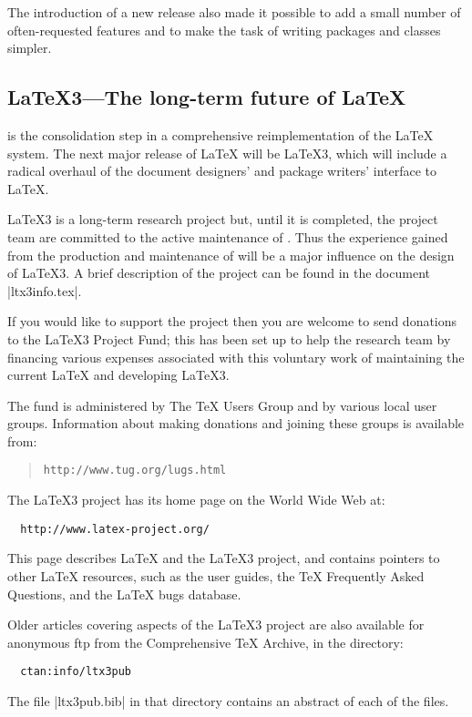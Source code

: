\documentclass{ltxguide}[2001/05/28]
\begin{document}
The introduction of a new release also made it possible to add a small
number of often-requested features and to make the task of writing
packages and classes simpler.

\subsection{\LaTeX3---The long-term future of \LaTeX}
\label{Sec:ltx3}

\LaTeXe{} is the consolidation step in a comprehensive
reimplementation of the \LaTeX{} system.  The next major release of
\LaTeX{} will be \LaTeX3, which will include a radical overhaul of the
document designers' and package writers' interface to \LaTeX.

\LaTeX3 is a long-term research project but, until it is completed,
the project team are committed to the active maintenance of \LaTeXe{}.
Thus the experience gained from the production and maintenance of
\LaTeXe{} will be a major influence on the design of \LaTeX3.
A brief description of the project can be found in the document
|ltx3info.tex|.

If you would like to support the project then you are welcome to send
donations to the \LaTeX3 Project Fund; this has been set up to help
the research team by financing various expenses associated with this
voluntary work of maintaining the current \LaTeX{} and developing
\LaTeX3.

The fund is administered by The \TeX{} Users Group and by various
local user groups.  Information about making donations and joining
these groups is available from:
\begin{quote}\small\label{addrs}
   \texttt{http://www.tug.org/lugs.html}
\end{quote}

The \LaTeX3{} project has its home page
on the World Wide Web at:
\begin{verbatim}
  http://www.latex-project.org/
\end{verbatim}
This page describes \LaTeX{} and the \LaTeX3 project, and contains
pointers to other \LaTeX{} resources, such as the user guides, the
\TeX{} Frequently Asked Questions, and the \LaTeX{} bugs database.

Older articles covering aspects of the \LaTeX3 project are also
available for anonymous ftp from the Comprehensive \TeX{} Archive, in
the directory:
\begin{verbatim}
  ctan:info/ltx3pub
\end{verbatim}
The file |ltx3pub.bib| in that directory contains an abstract of each
of the files.
\end{document}
